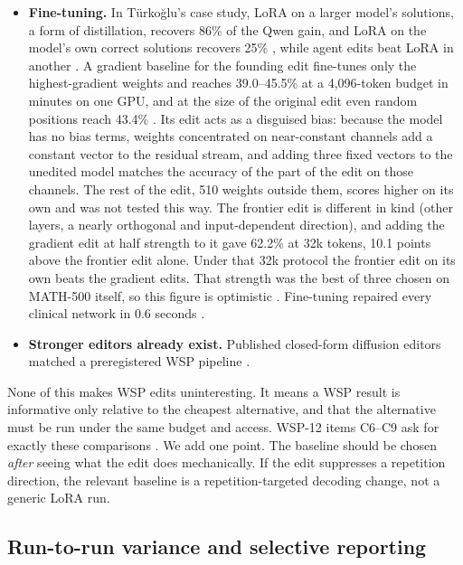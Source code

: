 \begin{itemize}[leftmargin=*,itemsep=2pt]
\item \textbf{Fine-tuning.} In Türkoğlu's case study, LoRA on a larger model's solutions, a form of distillation, recovers 86\% of the Qwen gain, and LoRA on the model's own correct solutions recovers 25\% \citep{turkoglu2026survey}, while agent edits beat LoRA in another \citep{zen24208534}. A gradient baseline for the founding edit fine-tunes only the highest-gradient weights and reaches 39.0--45.5\% at a 4{,}096-token budget in minutes on one GPU, and at the size of the original edit even random positions reach 43.4\% \citep{ax2611_33133}. Its edit acts as a disguised bias: because the model has no bias terms, weights concentrated on near-constant channels add a constant vector to the residual stream, and adding three fixed vectors to the unedited model matches the accuracy of the part of the edit on those channels. The rest of the edit, 510 weights outside them, scores higher on its own and was not tested this way. The frontier edit is different in kind (other layers, a nearly orthogonal and input-dependent direction), and adding the gradient edit at half strength to it gave 62.2\% at 32k tokens, 10.1 points above the frontier edit alone. Under that 32k protocol the frontier edit on its own beats the gradient edits. That strength was the best of three chosen on MATH-500 itself, so this figure is optimistic \citep{ax2611_33133}. Fine-tuning repaired every clinical network in 0.6 seconds \citep{ax2611_05341}.
\item \textbf{Stronger editors already exist.} Published closed-form diffusion editors matched a preregistered WSP pipeline \citep{ax2611_22228}.
\end{itemize}
None of this makes WSP edits uninteresting. It means a WSP result is informative only relative to the cheapest alternative, and that the alternative must be run under the same budget and access. WSP-12 items C6--C9 ask for exactly these comparisons \citep{turkoglu2026survey}. We add one point. The baseline should be chosen \emph{after} seeing what the edit does mechanically. If the edit suppresses a repetition direction, the relevant baseline is a repetition-targeted decoding change, not a generic LoRA run.

\subsection{Run-to-run variance and selective reporting}
\label{sec:variance}


